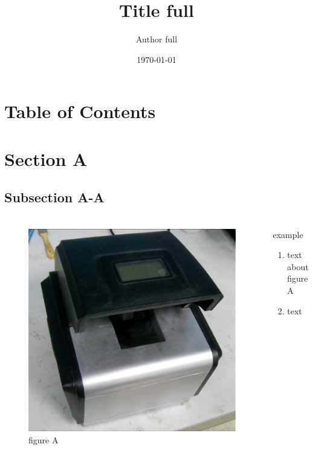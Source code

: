\documentclass{beamer}
\begin{document}
\title[Title short]{Title full}
\author[Author short]{Author full}
\date{\today}
\frame{\titlepage}


\section*{Table of Contents}
\frame {
  \frametitle{\secname}
  \tableofcontents
}


\section{Section A}

\subsection{Subsection A-A}

\begin{frame}
\frametitle{\subsecname}
  \begin{columns}
    \begin{figure}
    \includegraphics[width=\textwidth]{image/test-image1}
    \caption{figure A}
    \end{figure}
    \begin{block}{example}
      \begin{enumerate}
        \item<alert@1>
        text about figure A
        \item
        text
      \end{enumerate}
    \end{block}
  \end{columns}
\end{frame}
\end{document}
